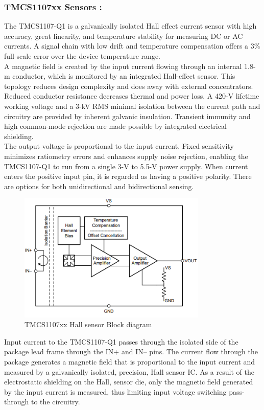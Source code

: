 \subsubsection{TMCS1107xx Sensors :}
The TMCS1107-Q1 is a galvanically isolated Hall effect current sensor with high accuracy, great linearity, and temperature stability for measuring DC or AC currents. A signal chain with low drift and temperature compensation offers a $3\%$ full-scale error over the device temperature range.\\
A magnetic field is created by the input current flowing through an internal 1.8-m conductor, which is monitored by an integrated Hall-effect sensor. This topology reduces design complexity and does away with external concentrators. Reduced conductor resistance decreases thermal and power loss. A 420-V lifetime working voltage and a 3-kV RMS minimal isolation between the current path and circuitry are provided by inherent galvanic insulation. Transient immunity and high common-mode rejection are made possible by integrated electrical shielding. \\
The output voltage is proportional to the input current. Fixed sensitivity minimizes ratiometry errors and enhances supply noise rejection, enabling the TMCS1107-Q1 to run from a single 3-V to 5.5-V power supply. When current enters the positive input pin, it is regarded as having a positive polarity. There are options for both unidirectional and bidirectional sensing.\\
\begin{figure}[h]
	\centering
	\includegraphics[width=0.8\textwidth]{Chap05/Figures/TMCS1107_HallSensor.PNG}
	\caption{TMCS1107xx Hall sensor Block diagram} 
	\label{fig:TMCS1107xx Hall sensor Block diagram}
\end{figure}
Input current to the TMCS1107-Q1 passes through the isolated side of the package lead frame through the
IN+ and IN– pins. The current flow through the package generates a magnetic field that is proportional to the
input current and measured by a galvanically isolated, precision, Hall sensor IC. As a result of the electrostatic
shielding on the Hall, sensor die, only the magnetic field generated by the input current is measured, thus limiting
input voltage switching pass-through to the circuitry\cite{TI_Hall_Current_Sensing_TMCS1107}.

